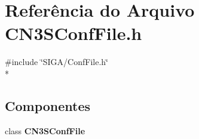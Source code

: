 \section{Referência do Arquivo C\+N3\+S\+Conf\+File.\+h}
\label{_c_n3_s_conf_file_8h}
{\ttfamily \#include \char`\"{}S\+I\+G\+A/\+Conf\+File.\+h\char`\"{}}\\*
\subsection*{Componentes}
\begin{DoxyCompactItemize}
\item 
class {\bf C\+N3\+S\+Conf\+File}
\end{DoxyCompactItemize}
